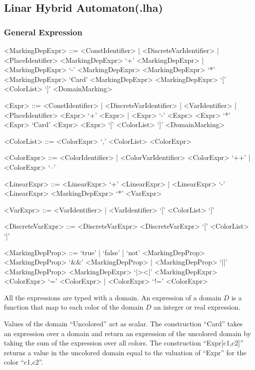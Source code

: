 \documentclass{article}
\begin{document}
\subsection{Linar Hybrid Automaton(.lha)}

\subsubsection{General Expression}

\begin{scriptsize}
\begin{grammar}
  <MarkingDepExpr> ::= <ConstIdentifier> | <DiscreteVarIdentifier> | <PlaceIdentifier>
  \alt  <MarkingDepExpr> `+'  <MarkingDepExpr> | <MarkingDepExpr> `-'  <MarkingDepExpr>
  \alt  <MarkingDepExpr> `*'  <MarkingDepExpr>
  \alt `Card' <MarkingDepExpr>
  \alt <MarkingDepExpr> `[' <ColorList> `]'
  \alt <DomainMarking>

 <Expr> ::= <ConstIdentifier> | <DiscreteVarIdentifier>  | <VarIdentifier> | <PlaceIdentifier>
  \alt  <Expr> `+'  <Expr> | <Expr> `-'  <Expr>
  \alt  <Expr> `*'  <Expr>
  \alt `Card' <Expr>
  \alt <Expr> `[' <ColorList> `]'
  \alt <DomainMarking>

  <ColorList> ::= <ColorExpr> `,' <ColorList>
  \alt <ColorExpr>

  <ColorExpr> ::= <ColorIdentifier> | <ColorVarIdentifier>
  \alt <ColorExpr> `++' | <ColorExpr> `--'

  <LinearExpr> ::= <LinearExpr> `+'  <LinearExpr> | <LinearExpr> `-'  <LinearExpr>
  \alt <MarkingDepExpr> `*' <VarExpr>

  <VarExpr> ::= <VarIdentifier> | <VarIdentifier> `[' <ColorList> `]'

  <DiscreteVarExpr> ::= <DiscreteVarExpr> \alt <DiscreteVarExpr> `[' <ColorList> `]'

<MarkingDepProp> ::= `true' | `false' | `not' <MarkingDepProp>
  \alt <MarkingDepProp> `\&\&' <MarkingDepProp> |  <MarkingDepProp> `||' <MarkingDepProp>
  \alt <MarkingDepExpr> `|\!\!>\!<\!\!|' <MarkingDepExpr>  
  \alt <ColorExpr> `=' <ColorExpr> | <ColorExpr> `!=' <ColorExpr>

\end{grammar}
\end{scriptsize}

All the expressions are typed with a domain. An expression of a domain
$D$ is a function that map to each color of the domain $D$ an integer
or real expression. 

Values of the domain ``Uncolored'' act as scalar.  The construction
``Card'' takes an expression over a domain and return an expression of
the uncolored domain by taking the sum of the expression over all
colors. The construction ``Expr[c1,c2]'' returns a value in the
uncolored domain equal to the valuation of ``Expr'' for the color
``c1,c2''.
\end{document}
